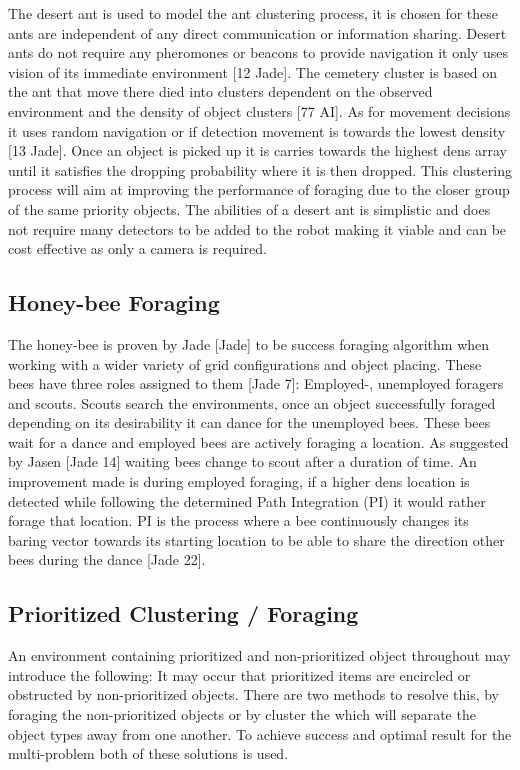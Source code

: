 \documentclass[12pt]{article}
\begin{document}
\par{The desert ant is used to model the ant clustering process, it is chosen for these ants are independent of any direct communication or information sharing. Desert ants do not require any pheromones or beacons to provide navigation it only uses vision of its immediate environment [12 Jade]. The cemetery cluster is based on the ant that move there died into clusters dependent on the observed environment and the density of object clusters [77 AI]. As for movement decisions it uses random navigation or if detection movement is towards the lowest density [13 Jade]. Once an object is picked up it is carries towards the highest dens array until it satisfies the dropping probability where it is then dropped.  This clustering process will aim at improving the performance of foraging due to the closer group of the same priority objects. The abilities of a desert ant is simplistic and does not require many detectors to be added to the robot making it viable and can be cost effective as only a camera is required.}

\subsection{Honey-bee Foraging}

\par{The honey-bee is proven by Jade [Jade] to be success foraging algorithm when working with a wider variety of grid configurations and object placing. These bees have three roles assigned to them [Jade 7]: Employed-, unemployed foragers and scouts. Scouts search the environments, once an object successfully foraged depending on its desirability it can dance for the unemployed bees. These bees wait for a dance and employed bees are actively foraging a location. As suggested by Jasen [Jade 14] waiting bees change to scout after a duration of time. An improvement made is during employed foraging, if a higher dens location is detected while following the determined Path Integration (PI) it would rather forage that  location. PI is the process where a bee continuously changes its baring vector towards its starting location to be able to share the direction other bees during the dance [Jade 22].}

\subsection{Prioritized Clustering / Foraging}

\par{An environment containing prioritized and non-prioritized object throughout may introduce the following: It may occur that prioritized items are encircled or obstructed by non-prioritized objects. There are two methods to resolve this, by foraging the non-prioritized objects or by cluster the which will separate the object types away from one another. To achieve success and optimal result for the multi-problem both of these solutions is used.}
\end{document}

